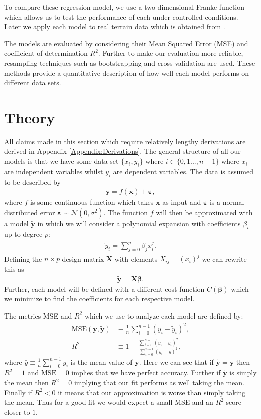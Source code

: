 \documentclass[%
reprint,
amsmath,amssymb,
aps,
pra,
]{revtex4-2}
\begin{document}
To compare these regression model, we use a two-dimensional Franke function which allows us to test the performance of each under controlled conditions. Later we apply each model to real terrain data which is obtained from \cite{USGS_EarthExplorer}.

The models are evaluated by considering their Mean Squared Error (MSE) and coefficient of determination $R^2$. Further to make our evaluation more reliable, resampling techniques such as bootstrapping and cross-validation are used. These methods provide a quantitative description of how well each model performs on different data sets.
\section{Theory}
All claims made in this section which require relatively lengthy derivations are derived in Appendix \ref{Appendix:Derivations}. The general structure of all our models is that we have some data set $\{x_i,y_i\}$ where $i\in\{0,1...,n-1\}$ where $x_i$ are independent variables whilst $y_i$ are dependent variables. The data is assumed to be described by
\begin{align}
	\bm y=f(\bm x)+\bm \varepsilon,
	\label{eq:data}
\end{align}
where $f$ is some continuous function which takes $\bm x$ as input and $\bm\varepsilon$ is a normal distributed error $\bm\varepsilon\sim\mathcal{N}(0,\sigma^2)$. The function $f$ will then be approximated with a model $\tilde{\bm y}$ in which we will consider a polynomial expansion with coefficients $\beta_i$ up to degree $p$:
\begin{align}
	\tilde{y}_i=\sum_{j=0}^{p}\beta_j x_i^j.
	\label{eq:model}
\end{align}
Defining the $n\times p$ design matrix $\bm X$ with elements $X_{ij}=(x_i)^j$ we can rewrite this as
\begin{align}
	\tilde{\bm y}=\bm X\bm\beta.
\end{align}
Further, each model will be defined with a different cost function $C(\bm\beta)$ which we minimize to find the coefficients for each respective model.

The metrics MSE and $R^2$ which we use to analyze each model are defined by:
\begin{align}
	\text{MSE}(\bm y,\tilde{\bm{y}})&\equiv\frac{1}{n}\sum_{i=0}^{n-1}(y_i-\tilde y_i)^2,\\
	R^2&\equiv1-\frac{\sum_{i=0}^{n-1}(y_i-\tilde y_i)^2}{\sum_{i=0}^{n-1}(y_i-\bar y)^2},
\end{align}
where $\bar y\equiv\frac{1}{n}\sum_{i=0}^{n-1}y_i$ is the mean value of $\bm y$. Here we can see that if $\tilde{\bm{y}}=\bm y$ then $R^2=1$ and $\text{MSE}=0$ implies that we have perfect accuracy. Further if $\tilde{\bm{y}}$ is simply the mean then $R^2=0$ implying that our fit performs as well taking the mean. Finally if $R^2<0$ it means that our approximation is worse than simply taking the mean. Thus for a good fit we would expect a small MSE and an $R^2$ score closer to $1$.
\end{document}
